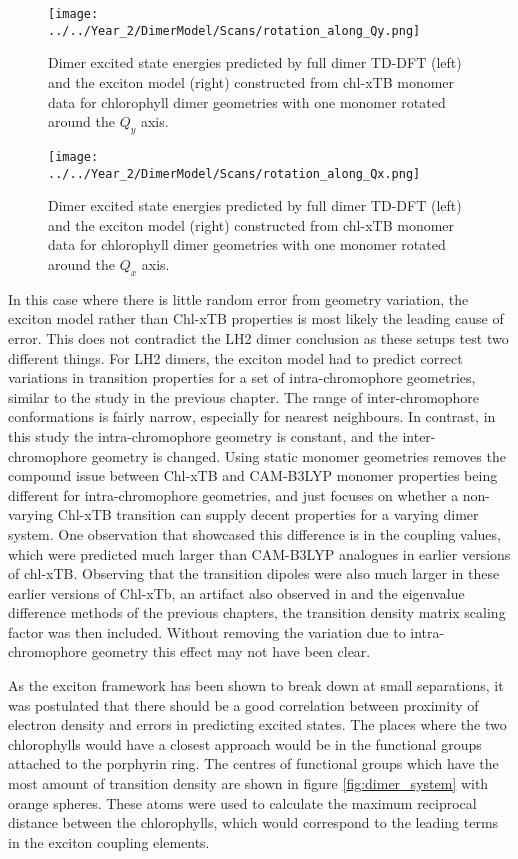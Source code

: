 \begin{figure}
    \centering
    \texttt{[image: ../../Year\_2/DimerModel/Scans/rotation\_along\_Qy.png]}
    \caption{Dimer excited state energies predicted by full dimer TD-DFT (left)
    and the exciton model (right) constructed from chl-xTB monomer data for chlorophyll 
    dimer geometries with one monomer rotated around the $Q_y$ axis.}
    \label{fig:chl_xtb_rot_Qy}
\end{figure}

\begin{figure}
    \centering
    \texttt{[image: ../../Year\_2/DimerModel/Scans/rotation\_along\_Qx.png]}
    \caption{Dimer excited state energies predicted by full dimer TD-DFT (left)
    and the exciton model (right) constructed from chl-xTB monomer data for chlorophyll 
    dimer geometries with one monomer rotated around the $Q_x$ axis.}
    \label{fig:chl_xtb_rot_Qx}
\end{figure}

In this case where there is little random error from geometry variation, the exciton
model rather than Chl-xTB properties is most likely the leading cause of error. 
This does not contradict the LH2 dimer conclusion as these setups test two different
things. For LH2 dimers, the exciton model had to predict correct variations in transition
properties for a set of intra-chromophore geometries, similar to the study in the 
previous chapter. The range of inter-chromophore conformations is fairly narrow,
especially for nearest neighbours. In contrast, in this study the intra-chromophore 
geometry is constant, and the inter-chromophore geometry is changed. Using static 
monomer geometries removes the compound issue between Chl-xTB and CAM-B3LYP monomer
properties being different for intra-chromophore geometries, and just focuses on 
whether a non-varying Chl-xTB transition can supply decent properties for a varying 
dimer system. One observation that showcased this difference is in the coupling 
values, which were predicted much larger than CAM-B3LYP analogues in earlier versions
of chl-xTB. Observing that the transition dipoles were also much larger in these 
earlier versions of Chl-xTb, an artifact also observed in \dscf and the eigenvalue
difference methods of the previous chapters, the transition density matrix scaling 
factor was then included. Without removing the variation due to intra-chromophore 
geometry this effect may not have been clear.

As the exciton framework has been shown to break down at small separations, it was
postulated that there should be a good correlation between proximity of electron
density and errors in predicting excited states. The places where the two chlorophylls
would have a closest approach would be in the functional groups attached to the 
porphyrin ring. The centres of functional groups which have the most amount of transition
density are shown in figure \ref{fig:dimer_system} with orange spheres. These atoms
were used to calculate the maximum reciprocal distance between the chlorophylls, 
which would correspond to the leading terms in the exciton coupling elements.

